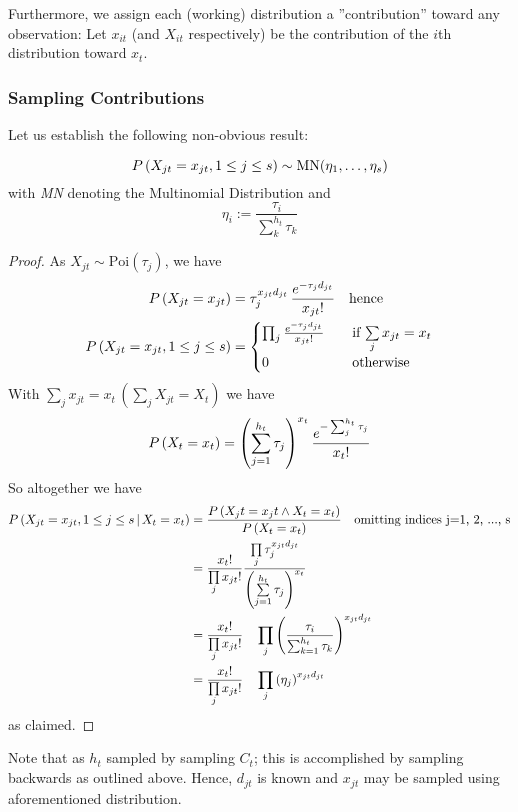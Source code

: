 			Furthermore, we assign each (working) distribution a ''contribution'' toward any observation: Let $x_{it}$ (and $X_{it}$ respectively) be the contribution of the $i$th distribution toward $x_t$. 
			
			
		\subsubsection{Sampling Contributions}
			Let us establish the following non-obvious result:
		
			\begin{lemma}
				\[P \left(X_{jt} = x_{jt}, 1 \leq j \leq s\right) \sim \text{MN}(\eta_1, \dots, \eta_s) 
				\]
				with \textit{MN} denoting the Multinomial Distribution and
				\[
					\eta_i := \frac{\tau_i}{\sum_k^{h_t} \tau_k}
				\]
			\end{lemma}
		
			\begin{proof}
				As $X_{jt} \sim \text{Poi}(\tau_j)$, we have
				\begin{align*}
					P \left(X_{jt} = x_{jt}\right)& = 
					\tau_j^{x_{jt} d_{jt}} \,
					\frac{e^{- \tau_j d_{jt}}}{x_{jt}!} \quad \text{hence} \\
					P \left(X_{jt} = x_{jt}, 1 \leq j \leq s\right)
					&= \begin{cases}
						 \prod_j 	\frac{e^{- \tau_j d_{jt}}}{x_{jt}!}
						 	&\quad \text{if} \, \sum\limits_{j} x_{jt} = x_t \\
						 0  & \quad \text{otherwise}
					\end{cases}
				\end{align*}
				With $\sum_{j} x_{jt} = x_t \,  \left(\sum_{j} X_{jt} = X_t\right)$ we have
				\[
					\uP{X_t = x_t} = \left(
						\sum_{j=1}^{h_t} \tau_j
					\right)^{x_t} 
%					
					\frac{e^{- \sum_{j}^{h_t} \tau_j}}{
					x_t!}	
				\]
				So altogether we have
				\begin{align*}
					P\left(X_{jt} = x_{jt}, 1 \leq j \leq s \, | \, X_t = x_t\right) &= 
					\frac{P \left(X_jt = x_jt \land X_t = x_t\right)}{P \left(X_t = x_t\right)}
					\quad \text{omitting indices j=1, 2, ..., s} \\
					&= \frac{x_t!}{\prod\limits_j x_{jt}!}
					\frac{
						\prod\limits_j \tau_j^{x_{jt} d_{jt}}}
					{
							\left(
							\sum\limits_{j=1}^{h_t} \tau_j
							\right)^{ x_t}
					} \\
				&= \frac{x_t!}{\prod\limits_j x_{jt}!}\quad
				\prod\limits_{j} \left(
					\frac{\tau_i}{\sum_{k=1}^{h_t} \tau_k}
				\right)^{x_{jt} d_{jt}} \\
				&= \frac{x_t!}{\prod\limits_j x_{jt}!}\quad
				\prod\limits_{j} \left(
					\eta_j
				\right)^{x_{jt} d_{jt}}
				\end{align*}
				as claimed. 
			\end{proof}
		
		Note that as $h_t$ sampled by sampling $C_t$; this is accomplished by sampling backwards as outlined above. Hence, $d_{jt}$ is known and $x_{jt}$ may be sampled using aforementioned distribution. 
		
		 
 	
 		
 	
 		